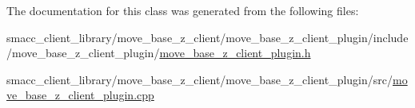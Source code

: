 The documentation for this class was generated from the following files\+:\begin{DoxyCompactItemize}
\item 
smacc\+\_\+client\+\_\+library/move\+\_\+base\+\_\+z\+\_\+client/move\+\_\+base\+\_\+z\+\_\+client\+\_\+plugin/include/move\+\_\+base\+\_\+z\+\_\+client\+\_\+plugin/\hyperlink{move__base__z__client__plugin_8h}{move\+\_\+base\+\_\+z\+\_\+client\+\_\+plugin.\+h}\item 
smacc\+\_\+client\+\_\+library/move\+\_\+base\+\_\+z\+\_\+client/move\+\_\+base\+\_\+z\+\_\+client\+\_\+plugin/src/\hyperlink{move__base__z__client__plugin_8cpp}{move\+\_\+base\+\_\+z\+\_\+client\+\_\+plugin.\+cpp}\end{DoxyCompactItemize}
